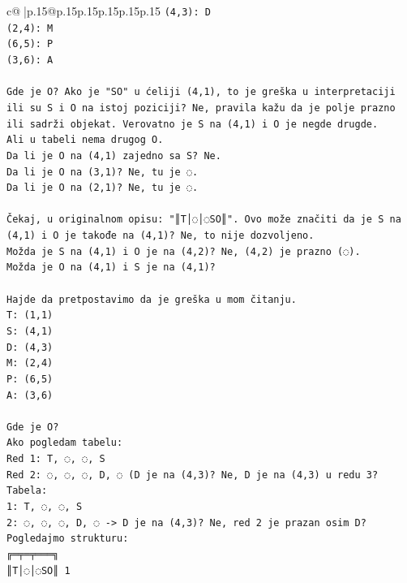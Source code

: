\documentclass{article}
\begin{document}
{\begin{supertabular}{c@{$\;$}|p{.15\linewidth}@{}p{.15\linewidth}p{.15\linewidth}p{.15\linewidth}p{.15\linewidth}p{.15\linewidth}}
{{{\texttt{(4,3): D} \\
\texttt{(2,4): M} \\
\texttt{(6,5): P} \\
\texttt{(3,6): A} \\
\\ 
\texttt{Gde je O? Ako je "SO" u ćeliji (4,1), to je greška u interpretaciji ili su S i O na istoj poziciji? Ne, pravila kažu da je polje prazno ili sadrži objekat. Verovatno je S na (4,1) i O je negde drugde.} \\
\texttt{Ali u tabeli nema drugog O.} \\
\texttt{Da li je O na (4,1) zajedno sa S? Ne.} \\
\texttt{Da li je O na (3,1)? Ne, tu je ◌.} \\
\texttt{Da li je O na (2,1)? Ne, tu je ◌.} \\
\\ 
\texttt{Čekaj, u originalnom opisu: "║T│◌│◌SO║". Ovo može značiti da je S na (4,1) i O je takođe na (4,1)? Ne, to nije dozvoljeno.} \\
\texttt{Možda je S na (4,1) i O je na (4,2)? Ne, (4,2) je prazno (◌).} \\
\texttt{Možda je O na (4,1) i S je na (4,1)?} \\
\\ 
\texttt{Hajde da pretpostavimo da je greška u mom čitanju.} \\
\texttt{T: (1,1)} \\
\texttt{S: (4,1)} \\
\texttt{D: (4,3)} \\
\texttt{M: (2,4)} \\
\texttt{P: (6,5)} \\
\texttt{A: (3,6)} \\
\\ 
\texttt{Gde je O?} \\
\texttt{Ako pogledam tabelu:} \\
\texttt{Red 1: T, ◌, ◌, S} \\
\texttt{Red 2: ◌, ◌, ◌, D, ◌ (D je na (4,3)? Ne, D je na (4,3) u redu 3?} \\
\texttt{Tabela:} \\
\texttt{1: T, ◌, ◌, S} \\
\texttt{2: ◌, ◌, ◌, D, ◌ {-}> D je na (4,3)? Ne, red 2 je prazan osim D?} \\
\texttt{Pogledajmo strukturu:} \\
\texttt{╔═╤═╤═══╗} \\
\texttt{║T│◌│◌SO║ 1} \\
}}}
\end{supertabular}}
\end{document}
